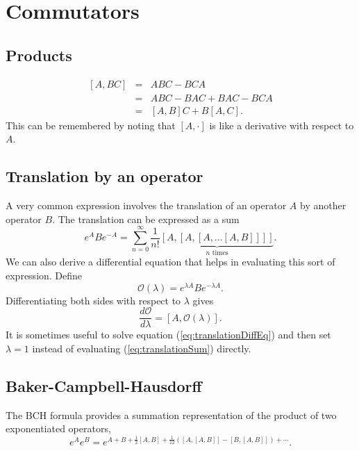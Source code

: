 \section{Commutators}

\subsection{Products}

\begin{eqnarray}
\left[A,BC\right] & = & ABC-BCA \\
& = & ABC-BAC+BAC-BCA \\
& = & [A,B]C+B[A,C]. \end{eqnarray}
This can be remembered by noting that $[A,\cdot]$ is like a derivative with respect to $A$.

\subsection{Translation by an operator}

A very common expression involves the translation of an operator $A$ by another operator $B$. The translation can be expressed as a sum\begin{equation}
e^{A}Be^{-A}=\sum_{n=0}^{\infty}\frac{1}{n!}\underbrace{[A,[A,[A,\ldots[A,B]]]]}_{n\textrm{ times}}. \label{eq:translationSum} \end{equation}
We can also derive a differential equation that helps in evaluating this sort of expression. Define \begin{equation}
\mathcal{O}(\lambda) = e^{\lambda A} B e^{-\lambda A}. \end{equation}
Differentiating both sides with respect to $\lambda$ gives \begin{equation}
\frac{d\mathcal{O}}{d\lambda} = [A,\mathcal{O}(\lambda)]. \label{eq:translationDiffEq} \end{equation}
It is sometimes useful to solve equation (\ref{eq:translationDiffEq}) and then set $\lambda=1$ instead of evaluating (\ref{eq:translationSum}) directly.

\subsection{Baker-Campbell-Hausdorff}

The BCH formula provides a summation representation of the product of two exponentiated operators,
\begin{equation}
e^{A}e^{B}=e^{A+B+\frac{1}{2}[A,B]+\frac{1}{12}\left([A,[A,B]]-[B,[A,B]]\right)+\cdots}. \end{equation}

